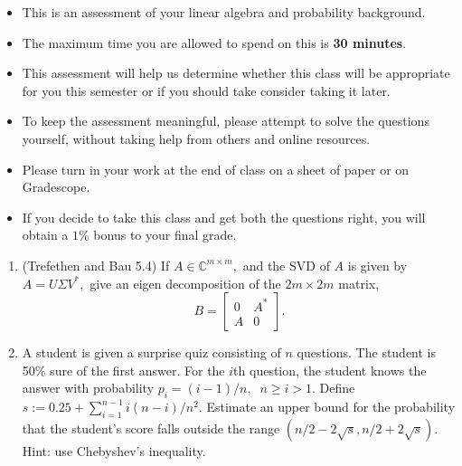\documentclass[12pt]{article}
\begin{document}
\MakeScribeTop

\begin{itemize}
	\item This is an assessment of your linear algebra and probability background.
	\item The maximum time you are allowed to spend on this is \textbf{30 minutes}.
	\item This assessment will help us determine whether this class will be appropriate for you this semester or if you should take consider taking it later.
	\item To keep the assessment meaningful, please attempt to solve the questions yourself, without taking help from others and online resources.
	\item Please turn in your work at the end of class on a sheet of paper or on Gradescope. 
	\item If you decide to take this class and get both the questions right, you will obtain a $1\%$ bonus to your final grade.
\end{itemize}
\vspace{1in}
\begin{enumerate}
	\item (Trefethen and Bau 5.4) If $A \in \mathbb{C}^{m\times m},$ and the SVD of $A$ is given by $A = U \Sigma V^*,$ give an eigen decomposition of the $2m \times 2m$ matrix,
		\begin{equation}
		B = \begin{bmatrix}
		0 & A^* \\
		A & 0
		\end{bmatrix}.
		\end{equation}
	\item A student is given a surprise quiz consisting of $n$ questions. The student is 50\% sure of the first answer. For the $i$th question, the student knows the answer with probability $p_i = (i-1)/n,\;\; n \geq i > 1.$ Define $s := 0.25 + \sum_{i=1}^{n-1} i(n-i)/n^2.$ Estimate an upper bound for the probability that the student's score falls outside the range $(n/2 - 2\sqrt{s}, n/2 + 2\sqrt{s})$. Hint: use Chebyshev's inequality. 
\end{enumerate}



\end{document}
